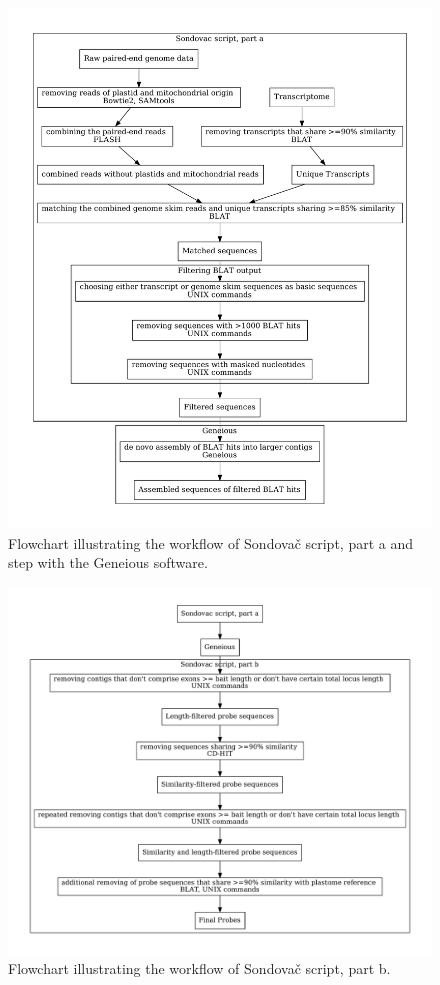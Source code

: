 \begin{figure}
\centerline{
	\includegraphics[width=1\textwidth]{graphs/sondovac_overview}
}
\caption[Sondovač pipeline workflow]{Flowchart illustrating the workflow of Sondovač script, part a and step with the Geneious software.}
\label{obr:workflowa}
\end{figure}

\begin{figure}
\centerline{
	\includegraphics[width=1\textwidth]{graphs/sondovac_overview_part_b}
}
\caption[Sondovač pipeline workflow -- part b]{Flowchart illustrating the workflow of Sondovač script, part b.}
\label{obr:workflowb}
\end{figure}


